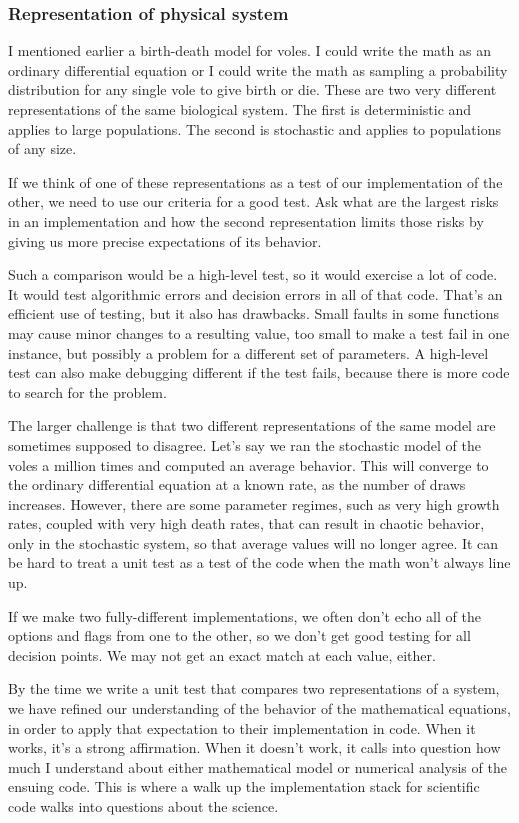\documentclass[fleqn,10pt]{olplainarticle}
\begin{document}
\subsubsection{Representation of physical system}

I mentioned earlier a birth-death model for voles. I could
write the math as an ordinary differential equation or I could
write the math as sampling a probability distribution for any single
vole to give birth or die. These are two very different representations
of the same biological system. The first is deterministic and applies
to large populations. The second is stochastic and applies to
populations of any size.

If we think of one of these representations as a test of our
implementation of the other, we need to use our criteria for
a good test. Ask what are the largest risks in an implementation
and how the second representation limits those risks by giving
us more precise expectations of its behavior.

Such a comparison would be a high-level test, so it would exercise
a lot of code. It would test algorithmic errors and decision errors
in all of that code. That's an efficient use of testing, but it also
has drawbacks. Small faults in some functions may cause minor
changes to a resulting value, too small to make a test fail
in one instance, but possibly a problem for a different set
of parameters. A high-level test can also make debugging different
if the test fails, because there is more code to search for
the problem.

The larger challenge is that two different representations of
the same model are sometimes supposed to disagree. Let's say
we ran the stochastic model of the voles a million times and
computed an average behavior. This will converge to the ordinary
differential equation at a known rate, as the number of draws
increases. However, there are some parameter regimes, such
as very high growth rates, coupled with very high death rates,
that can result in chaotic behavior, only in the stochastic system,
so that average values will no longer agree. It can be hard
to treat a unit test as a test of the code when the math
won't always line up.

If we make two fully-different implementations, we often don't
echo all of the options and flags from one to the other, so we
don't get good testing for all decision points. We may not
get an exact match at each value, either.

By the time we write a unit test that compares two representations
of a system, we have refined our understanding of the behavior
of the mathematical equations, in order to apply that expectation
to their implementation in code. When it works, it's a strong
affirmation. When it doesn't work, it calls into question how
much I understand about either mathematical model or numerical
analysis of the ensuing code. This is where a walk up the
implementation stack for scientific code walks into questions
about the science.
\end{document}
